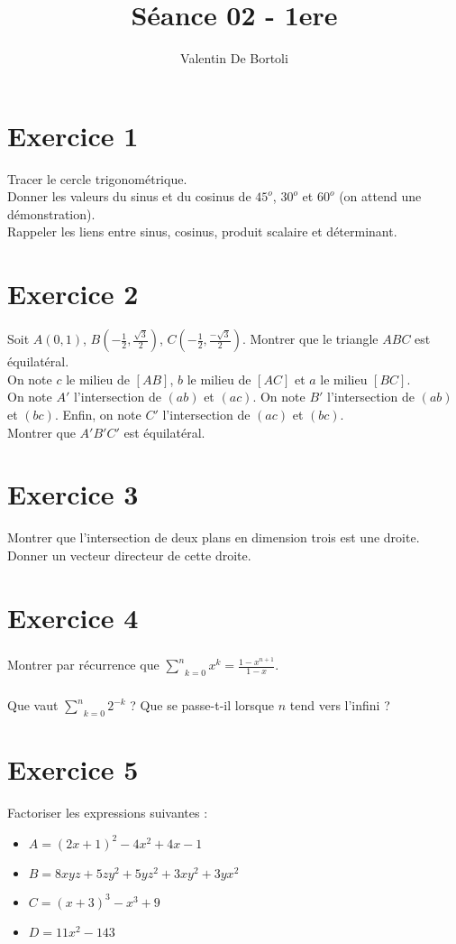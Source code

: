 \documentclass[10pt,a4paper]{article}
\title{Séance 02 - 1ere}
\author{Valentin De Bortoli}
\begin{document}
\maketitle

\section{Exercice 1}
Tracer le cercle trigonométrique.\\
Donner les valeurs du sinus et du cosinus de $45^o$, $30^o$ et $60^o$ (on attend une démonstration).\\
Rappeler les liens entre sinus, cosinus, produit scalaire et déterminant.

\section{Exercice 2}
Soit $A(0,1)$, $B(-\frac{1}{2}, \frac{\sqrt{3}}{2})$,
$C(-\frac{1}{2}, \frac{-\sqrt{3}}{2})$. Montrer que le triangle $ABC$ est équilatéral.\\
On note $c$ le milieu de $[AB]$, $b$ le milieu de $[AC]$ et $a$ le milieu $[BC]$.\\
On note $A'$ l'intersection de $(ab)$ et $(ac)$. On note $B'$ l'intersection de
$(ab)$ et $(bc)$. Enfin, on note $C'$ l'intersection de $(ac)$ et $(bc)$. \\
Montrer que $A'B'C'$ est équilatéral.

\section{Exercice 3}
Montrer que l'intersection de deux plans en dimension trois est une droite.\\
Donner un vecteur directeur de cette droite.

\section{Exercice 4}
\subparagraph{}Montrer par récurrence que $\underset{k=0}{\overset{n}{\sum}}x^k = \frac{1-x^{n+1}}{1-x}$.
\subparagraph{}Que vaut $\underset{k=0}{\overset{n}{\sum}}2^{-k}$ ? Que se passe-t-il lorsque $n$ tend vers l'infini ?

\section{Exercice 5}
Factoriser les expressions suivantes :
\begin{itemize}
\item $A = (2x+1) ^2 - 4x^2 +4x -1$
\item $B = 8xyz + 5zy^2 + 5 yz^2 + 3xy^2 + 3yx^2$
\item $C = (x+3)^3 - x^3 + 9$
\item $D = 11x^2 - 143$
\end{itemize}
\end{document}
